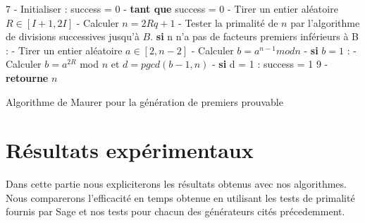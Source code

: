 \documentclass[a4paper,11pt]{article}
\renewcommand{\algorithmicreturn}{\textbf{retourne}}
\renewcommand{\algorithmicif}{\textbf{si}}
\renewcommand{\algorithmicwhile}{\textbf{tant que}}
\begin{document}
\begin{algorithm}[H]
 7 - Initialiser : success = 0  - \algorithmicwhile { success = 0}{ \newline
\hspace*{10mm}    - Tirer un entier aléatoire $R \in [I+1,2I] $ \newline
\hspace*{10mm}   - Calculer $n = 2Rq + 1 $ \newline
\hspace*{10mm} - Tester la primalité de $n$ par l'algorithme de divisions successives jusqu'à $B$. \;\newline
 \hspace*{11mm} \algorithmicif{  n n'a pas de facteurs premiers inférieurs à B :} \newline
 \hspace*{20mm} - Tirer un entier aléatoire $a \in [2,n-2]$ \newline
 \hspace*{20mm} - Calculer $ b = a^{n-1} mod n$ \newline
 \hspace*{20mm} - \algorithmicif{ $b = 1$ } : \newline
 \hspace*{30mm} - Calculer $ b = a^{2R}$ mod $n$ et $d = pgcd(b-1,n)$ \newline
 \hspace*{30mm} - \algorithmicif{ d = 1 : \newline  \hspace*{40mm} success = 1} \newline
 }
 9 - \algorithmicreturn{ $n$}
 \newline
 
 \caption{Algorithme de Maurer pour la génération de premiers prouvable}
\end{algorithm}


\section{Résultats expérimentaux}
Dans cette partie nous expliciterons les résultats obtenus avec nos algorithmes. Nous comparerons l'efficacité en temps obtenue en utilisant les tests de primalité fournis par Sage et nos tests pour chacun des générateurs cités précedemment.
\end{document}
